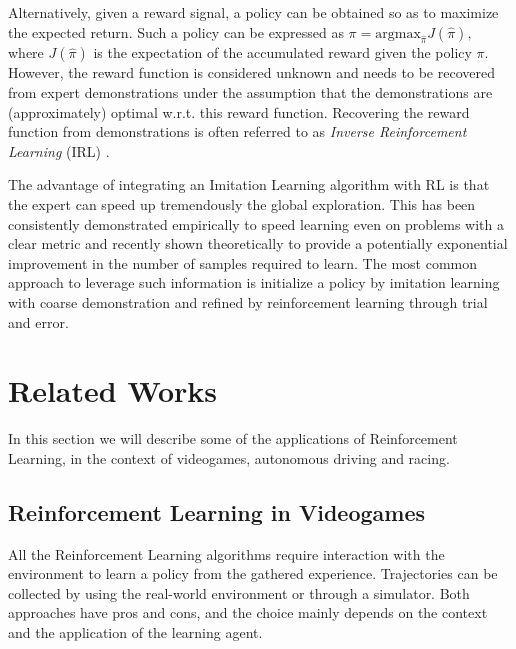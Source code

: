 Alternatively, given a reward signal, a policy can be obtained so as to maximize the expected return. Such a policy can be expressed as \(\pi=\text{argmax}_{\hat{\pi}}J(\hat{\pi}),\) where $J(\hat{\pi})$ is the expectation of the accumulated reward given the policy $\pi$. However, the reward function is considered unknown and needs to be recovered from expert demonstrations under the assumption that the demonstrations are (approximately) optimal w.r.t.
this reward function. Recovering the reward function from demonstrations is often referred to as \textit{Inverse Reinforcement Learning} (IRL) \cite{inverse}.

The advantage of integrating an Imitation Learning algorithm with RL is that the expert can speed up tremendously the global exploration. This has been consistently demonstrated empirically to speed learning even on problems with a clear metric and recently shown theoretically to provide a potentially exponential improvement in the number of samples required to learn. The most common approach to leverage such information is initialize a policy by imitation learning with coarse demonstration and refined by reinforcement learning through trial and error. 



\section{Related Works}



In this section we will describe some of the applications of Reinforcement Learning, in the context of videogames, autonomous driving and racing. 


\subsection{Reinforcement Learning in Videogames}

All the Reinforcement Learning algorithms require interaction with the environment to learn a policy from the gathered experience. Trajectories can be collected by using the real-world environment or through a simulator. 
Both approaches have pros and cons, and the choice mainly depends on the context and the application of the learning agent. 


